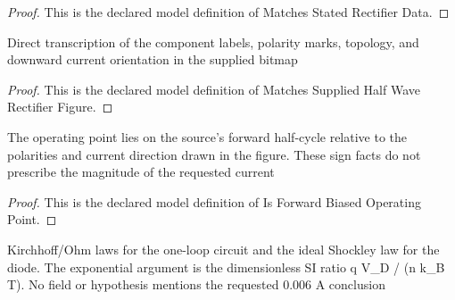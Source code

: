 \begin{proof}
  This is the declared model definition of Matches Stated Rectifier Data.
\end{proof}
\begin{definition}
  \label{def:physics:phyx-mini-0629:phyxminiproblems-problemphyxmini0629-matchessuppliedhalfwaverectifierfigure}
  Direct transcription of the component labels, polarity marks, topology, and downward current orientation in the supplied bitmap
\end{definition}
\begin{proof}
  This is the declared model definition of Matches Supplied Half Wave Rectifier Figure.
\end{proof}
\begin{definition}
  \label{def:physics:phyx-mini-0629:phyxminiproblems-problemphyxmini0629-isforwardbiasedoperatingpoint}
  The operating point lies on the source's forward half-cycle relative to the polarities and current direction drawn in the figure. These sign facts do not prescribe the magnitude of the requested current
\end{definition}
\begin{proof}
  This is the declared model definition of Is Forward Biased Operating Point.
\end{proof}
\begin{definition}
  \label{def:physics:phyx-mini-0629:phyxminiproblems-problemphyxmini0629-satisfieshalfwaverectifierlaws}
  Kirchhoff/Ohm laws for the one-loop circuit and the ideal Shockley law for the diode. The exponential argument is the dimensionless SI ratio q V\_D / (n k\_B T). No field or hypothesis mentions the requested 0.006 A conclusion
\end{definition}
